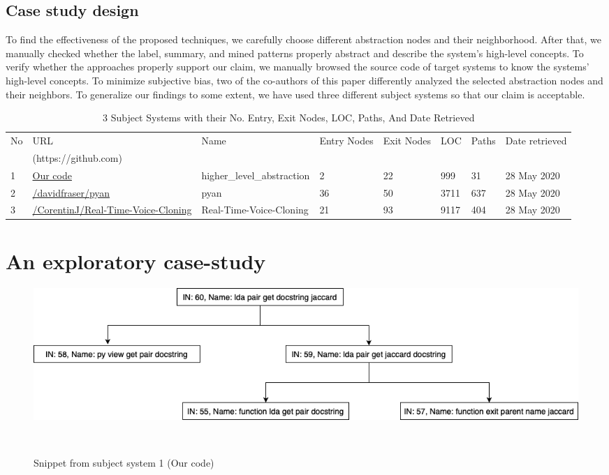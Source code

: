 \subsection{Case study design}
To find the effectiveness of the proposed techniques, we carefully choose different abstraction nodes and their neighborhood. After that, we manually checked whether the label, summary, and mined patterns properly abstract and describe the system's high-level concepts. To verify whether the approaches properly support our claim, we manually browsed the source code of target systems to know the systems' high-level concepts. To minimize subjective bias, two of the co-authors of this paper differently analyzed the selected abstraction nodes and their neighbors. To generalize our findings to some extent, we have used three different subject systems so that our claim is acceptable.

\begin{table}%
 \caption{3 Subject Systems with their No. Entry, Exit Nodes, LOC, Paths, And Date Retrieved}
\centering
\begin{tabular}{l|l|l|l|l|l|l|l}
No & URL & Name & Entry Nodes & Exit Nodes & LOC & Paths & Date retrieved\\
 & (https://github.com) &  &  &   & & &\\
\hline
1 & \url{Our code}& higher\_level\_abstraction & 2 & 22 & 999 & 31 &  28 May 2020\\
2 & \url{/davidfraser/pyan} & pyan & 36 & 50 & 3711 & 637 & 28 May 2020\\
3 & \url{/CorentinJ/Real-Time-Voice-Cloning}& Real-Time-Voice-Cloning & 21 & 93 & 9117 & 404 & 28 May 2020\\


\end{tabular}
\label{table:subject_systems}
\end{table}

\section{An exploratory case-study}
\begin{figure}[tb]
  \centering
  \includegraphics[width=1\columnwidth]{figures/hla2/rq1_hla1.png}
  \caption{Snippet from subject system 1 (Our code)}~\label{fig:rq1_hla1}
\end{figure}

